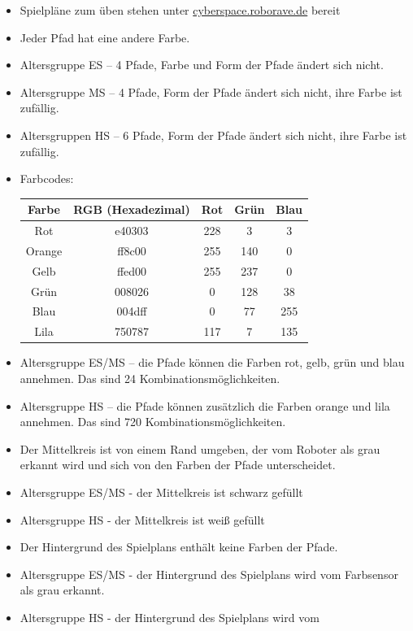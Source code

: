 \documentclass[a4paper,12pt]{article}
\begin{document}
\begin{itemize}
	\item Spielpläne zum üben stehen unter
\href{https://cyberspace.roborave.de}{cyberspace.roborave.de} bereit
	\item Jeder Pfad hat eine andere Farbe.
	\item Altersgruppe ES – 4 Pfade, Farbe und Form der Pfade ändert sich
	nicht.
	\item Altersgruppe MS – 4 Pfade, Form der Pfade ändert sich nicht,
	ihre Farbe ist zufällig.
	\item Altersgruppen HS – 6 Pfade, Form der Pfade ändert sich nicht,
	ihre Farbe ist zufällig.
	\item Farbcodes:
\begin{center}
	\begin{tabular}{|c|c|c|c|c|} \hline
		Farbe & RGB (Hexadezimal) & Rot & Grün & Blau \\ \hline
    		Rot & e40303 & 228 & 3 & 3 \\
    		Orange & ff8c00 & 255 & 140 & 0 \\
    		Gelb & ffed00 & 255 & 237 & 0 \\
    		Grün & 008026 & 0 & 128 & 38 \\
    		Blau & 004dff & 0 & 77 & 255 \\
    		Lila & 750787 & 117 & 7 & 135 \\ \hline
	\end{tabular}
\end{center}
	\item Altersgruppe ES/MS – die Pfade können die Farben rot, gelb, grün
		und blau annehmen. Das sind 24 Kombinationsmöglichkeiten.
	\item Altersgruppe HS – die Pfade können zusätzlich die Farben orange
		und lila annehmen. Das sind 720 Kombinationsmöglichkeiten.
	\item Der Mittelkreis ist von einem Rand umgeben, der vom Roboter als
		grau erkannt wird und sich von den Farben der Pfade
		unterscheidet.
	\item Altersgruppe ES/MS - der Mittelkreis ist schwarz gefüllt
	\item Altersgruppe HS - der Mittelkreis ist weiß gefüllt
	\item Der Hintergrund des Spielplans enthält keine Farben der Pfade.
	\item Altersgruppe ES/MS - der Hintergrund des Spielplans wird vom
		Farbsensor als grau erkannt.
	\item Altersgruppe HS - der Hintergrund des Spielplans wird vom

\end{itemize}
\end{document}
